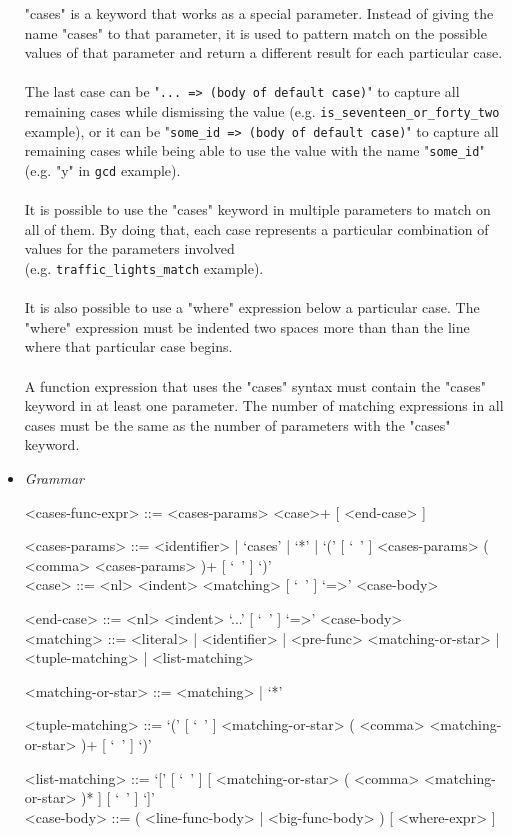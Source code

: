 \documentclass{article}
\begin{document}
\begin{itemize}
"cases" is a keyword that works as a special parameter.  Instead of giving the
name "cases" to that parameter, it is used to pattern match on the possible
values of that parameter and return a different result for each particular
case. 
\\\\
The last case can be "\texttt{... => (body of default case)}" to capture all
remaining cases while dismissing the value (e.g.
\texttt{is_seventeen_or_forty_two} example), or it can be
"\texttt{some_id => (body of default case)}" to capture all remaining
cases while being able to use the value with the name "\texttt{some_id}"
(e.g.  "y" in \texttt{gcd} example).
\\\\
It is possible to use the "cases" keyword in multiple parameters to match on
all of them. By doing that, each case represents a particular combination of
values for the parameters involved\\(e.g. \texttt{traffic_lights_match}
example).
\\\\
It is also possible to use a "where" expression below a particular case. The
"where" expression must be indented two spaces more than than the line where
that particular case begins.
\\\\
A function expression that uses the "cases" syntax must contain the "cases"
keyword in at least one parameter. The number of matching expressions in all
cases must be the same as the number of parameters with the "cases" keyword.

\item \textit{Grammar}
\begin{grammar}
<cases-func-expr> ::= <cases-params> <case>+ [ <end-case> ]

<cases-params> ::=
<identifier> | `cases' | `*' |
`(' [ `\ ' ] <cases-params> ( <comma> <cases-params> )+ [ `\ ' ] `)'
\\

<case> ::=  <nl> <indent> <matching> [ `\ ' ] `=>' <case-body>

<end-case> ::= <nl> <indent> `...' [ `\ ' ] `=>' <case-body>
\\

<matching> ::= 
<literal> | <identifier> | <pre-func> <matching-or-star> | <tuple-matching> |
<list-matching>

<matching-or-star> ::= <matching> | `*'

<tuple-matching> ::=
`(' [ `\ ' ] <matching-or-star> ( <comma> <matching-or-star> )+ [ `\ ' ] `)'

<list-matching> ::=
`[' [ `\ ' ] [ <matching-or-star> ( <comma> <matching-or-star> )* ] [ `\ ' ]
`]'
\\

<case-body> ::= ( <line-func-body> | <big-func-body> ) [ <where-expr> ]
\end{grammar}

\end{itemize}
\end{document}
